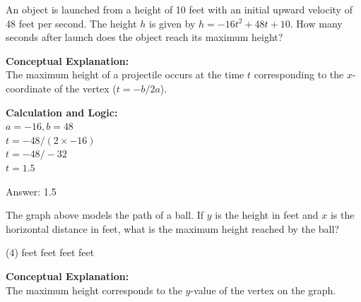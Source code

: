 \documentclass[11pt,paper=a4,answers]{exam}
\begin{document}
\begin{questions}
\vspace{40pt}

\question
An object is launched from a height of 10 feet with an initial upward velocity of 48 feet per second. The height $h$ is given by $h = -16t^2 + 48t + 10$. How many seconds after launch does the object reach its maximum height?

\begin{solution}
\textbf{Conceptual Explanation:} \\
The maximum height of a projectile occurs at the time $t$ corresponding to the $x$-coordinate of the vertex ($t = -b/2a$).

\vspace{20pt}

\textbf{Calculation and Logic:} \\
$a = -16, b = 48$ \\
$t = -48 / (2 \times -16)$ \\
$t = -48 / -32$ \\
$t = 1.5$

\vspace{25pt}

Answer: \colorbox{yellow!100}{1.5}
\end{solution}

\vspace{40pt}

\question
\begin{center}
\end{center}
The graph above models the path of a ball. If $y$ is the height in feet and $x$ is the horizontal distance in feet, what is the maximum height reached by the ball?
\begin{tasks}(4)
     feet
     feet
     feet
     feet
\end{tasks}

\begin{solution}
\textbf{Conceptual Explanation:} \\
The maximum height corresponds to the $y$-value of the vertex on the graph.


\end{solution}
\end{questions}
\end{document}
